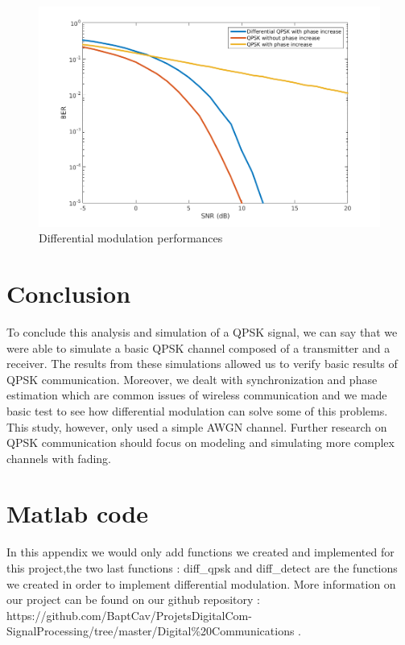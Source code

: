 \documentclass[a4paper,12pt]{article}
\begin{document}
\begin{figure}[ht!]
\centering
\begin{center}
\includegraphics[scale=0.65]{BER_phase_increase2.png}
\caption{Differential modulation performances}
\label{BERphase2}
\end{center}
\end{figure}

\section*{Conclusion}
To conclude this analysis and simulation of a QPSK signal, we can say that we were able to simulate a basic QPSK channel composed of a transmitter and a receiver. The results from these simulations allowed us to verify basic results of QPSK communication. Moreover, we dealt with synchronization and phase estimation which are common issues of wireless communication and we made basic test to see how differential modulation can solve some of this problems.\\

This study, however, only used a simple AWGN channel. Further research on QPSK communication should focus on modeling and simulating more complex channels with fading.

\appendix

\section*{Matlab code}
In this appendix we would only add functions we created and implemented for this project,the two last functions : diff_qpsk and diff_detect  are the functions we created in order to implement differential modulation. More information on our project can be found on our github repository : https://github.com/BaptCav/ProjetsDigitalCom-SignalProcessing/tree/master/Digital\%20Communications .
\end{document}
